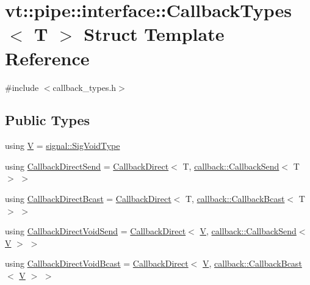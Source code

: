 \hypertarget{structvt_1_1pipe_1_1interface_1_1_callback_types}{}\section{vt\+:\+:pipe\+:\+:interface\+:\+:Callback\+Types$<$ T $>$ Struct Template Reference}
\label{structvt_1_1pipe_1_1interface_1_1_callback_types}


{\ttfamily \#include $<$callback\+\_\+types.\+h$>$}

\subsection*{Public Types}
\begin{DoxyCompactItemize}
\item 
using \hyperlink{structvt_1_1pipe_1_1interface_1_1_callback_types_aa4679a7719d01aefcc378cac3d3fa7a2}{V} = \hyperlink{namespacevt_1_1pipe_1_1signal_acbe257d1ae44f20fa9fd9b6ed3057caf}{signal\+::\+Sig\+Void\+Type}
\item 
using \hyperlink{structvt_1_1pipe_1_1interface_1_1_callback_types_a5a0780a0e2a74bdf7eb6b1ef76af2703}{Callback\+Direct\+Send} = \hyperlink{structvt_1_1pipe_1_1interface_1_1_callback_direct}{Callback\+Direct}$<$ T, \hyperlink{structvt_1_1pipe_1_1callback_1_1_callback_send}{callback\+::\+Callback\+Send}$<$ T $>$ $>$
\item 
using \hyperlink{structvt_1_1pipe_1_1interface_1_1_callback_types_a15fdd88ea5868c8e4e5c13f3f20d9977}{Callback\+Direct\+Bcast} = \hyperlink{structvt_1_1pipe_1_1interface_1_1_callback_direct}{Callback\+Direct}$<$ T, \hyperlink{structvt_1_1pipe_1_1callback_1_1_callback_bcast}{callback\+::\+Callback\+Bcast}$<$ T $>$ $>$
\item 
using \hyperlink{structvt_1_1pipe_1_1interface_1_1_callback_types_a84e507d3d6796d89e56a627f9d619f36}{Callback\+Direct\+Void\+Send} = \hyperlink{structvt_1_1pipe_1_1interface_1_1_callback_direct}{Callback\+Direct}$<$ \hyperlink{structvt_1_1pipe_1_1interface_1_1_callback_types_aa4679a7719d01aefcc378cac3d3fa7a2}{V}, \hyperlink{structvt_1_1pipe_1_1callback_1_1_callback_send}{callback\+::\+Callback\+Send}$<$ \hyperlink{structvt_1_1pipe_1_1interface_1_1_callback_types_aa4679a7719d01aefcc378cac3d3fa7a2}{V} $>$ $>$
\item 
using \hyperlink{structvt_1_1pipe_1_1interface_1_1_callback_types_adead84bf7d7837ee8530afdf7e33c581}{Callback\+Direct\+Void\+Bcast} = \hyperlink{structvt_1_1pipe_1_1interface_1_1_callback_direct}{Callback\+Direct}$<$ \hyperlink{structvt_1_1pipe_1_1interface_1_1_callback_types_aa4679a7719d01aefcc378cac3d3fa7a2}{V}, \hyperlink{structvt_1_1pipe_1_1callback_1_1_callback_bcast}{callback\+::\+Callback\+Bcast}$<$ \hyperlink{structvt_1_1pipe_1_1interface_1_1_callback_types_aa4679a7719d01aefcc378cac3d3fa7a2}{V} $>$ $>$

\end{DoxyCompactItemize}
